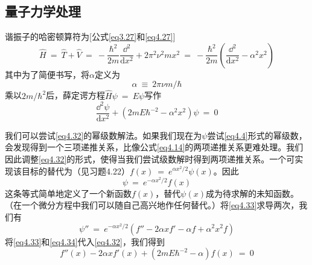 \documentclass[12pt,a4paper,openany]{ctexbook}
\newcommand{\dd}[1]{\mathrm{d} #1}
\begin{document}
\subsection{量子力学处理}
\begin{flushleft}
    \setlength{\parindent}{2em}
谐振子的哈密顿算符为[公式\eqref{eq3.27}和\eqref{eq4.27}]
\begin{equation}
    \hat{H}\ =\ \hat{T}+\hat{V}\ =\ -\frac{\hbar^2}{2m}\frac{\dd^2}{\dd x^2}+2\pi^2\nu^2mx^2\ =\ -\frac{\hbar^2}{2m}(\frac{\dd^2}{\dd x^2}-\alpha^2x^2) \label{eq4.30}
\end{equation}
其中为了简便书写，将$\alpha$定义为
\begin{equation}
    \alpha\ \equiv\ 2\pi\nu m/\hbar \label{eq4.31}
\end{equation}
乘以$2m/\hbar^2$后，薛定谔方程$\hat{H}\psi\ =\ E\psi$写作
\begin{equation}
    \frac{\dd^2\psi}{\dd x^2}+(2mE\hbar^{-2}-\alpha^2x^2)\psi\ =\ 0 \label{eq4.32}
\end{equation}

我们可以尝试\eqref{eq4.32}的幂级数解法。如果我们现在为$\psi$尝试\eqref{eq4.4}形式的幂级数，会发现得到一个三项递推关系，比像公式\eqref{eq4.14}的两项递推关系更难处理。我们因此调整\eqref{eq4.32}的形式，使得当我们尝试级数解时得到两项递推关系。一个可实现该目标的替代为（见习题4.22）$f(x)\ =\ e^{\alpha x^2/2}\psi(x)$。因此
\begin{equation}
    \psi\ =\ e^{-\alpha x^2/2}f(x) \label{eq4.33}
\end{equation}
这条等式简单地定义了一个新函数$f(x)$，替代$\psi(x)$成为待求解的未知函数。（在一个微分方程中我们可以随自己高兴地作任何替代。）将\eqref{eq4.33}求导两次，我们有
\begin{equation}
    \psi''\ =\ e^{-\alpha x^2/2}(f''-2\alpha xf'-\alpha f+\alpha^2x^2f) \label{eq4.34}
\end{equation}
将\eqref{eq4.33}和\eqref{eq4.34}代入\eqref{eq4.32}，我们得到
\begin{equation}
    f''(x)-2\alpha xf'(x)+(2mE\hbar^{-2}-\alpha)f(x)\ =\ 0 \label{eq4.35}
\end{equation}


\end{flushleft}
\end{document}
